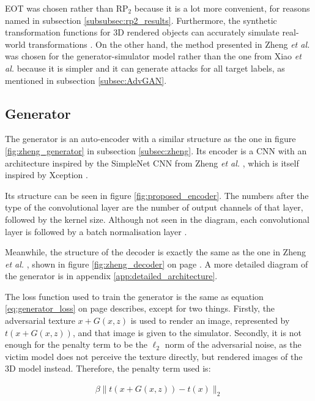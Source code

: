 EOT \cite{athalye} was chosen rather than $\textrm{RP}_2$ \cite{evtimov_road_signs} because it is a lot more convenient, for reasons named in subsection \ref{subsubsec:rp2_results}. Furthermore, the synthetic transformation functions for 3D rendered objects can accurately simulate real-world transformations \cite{athalye}. On the other hand, the method presented in Zheng \textit{et al.} \cite{zheng_black_box_GAN} was chosen for the generator-simulator model rather than the one from Xiao \textit{et al.} \cite{advGAN} because it is simpler and it can generate attacks for all target labels, as mentioned in subsection \ref{subsec:AdvGAN}.

\subsection{Generator}
    \label{subsec:g_eot_generator}

The generator is an auto-encoder with a similar structure as the one in figure \ref{fig:zheng_generator} in subsection \ref{subsec:zheng}. Its encoder is a CNN with an architecture inspired by the SimpleNet CNN from Zheng \textit{et al.} \cite{zheng_black_box_GAN}, which is itself inspired by Xception \cite{xception}. 

Its structure can be seen in figure \ref{fig:proposed_encoder}. The numbers after the type of the convolutional layer are the number of output channels of that layer, followed by the kernel size. Although not seen in the diagram, each convolutional layer is followed by a batch normalisation layer \cite{batch_norm}.

Meanwhile, the structure of the decoder is exactly the same as the one in Zheng \textit{et al.} \cite{zheng_black_box_GAN}, shown in figure \ref{fig:zheng_decoder} on page \pageref{fig:zheng_decoder}. A more detailed diagram of the generator is in appendix \ref{app:detailed_architecture}.

The loss function used to train the generator is the same as equation \ref{eq:generator_loss} on page \pageref{eq:generator_loss} describes, except for two things. Firstly, the adversarial texture $x + G(x, z)$ is used to render an image, represented by $t(x + G(x,z))$, and that image is given to the simulator. Secondly, it is not enough for the penalty term to be the $\ell_2$ norm of the adversarial noise, as the victim model does not perceive the texture directly, but rendered images of the 3D model instead. Therefore, the penalty term used is:

\begin{equation}
    \label{eq:g-eot-l2-loss}
    \begin{aligned}
    \beta\|t(x + G(x,z)) - t(x)\|_2
    \end{aligned}
\end{equation}

